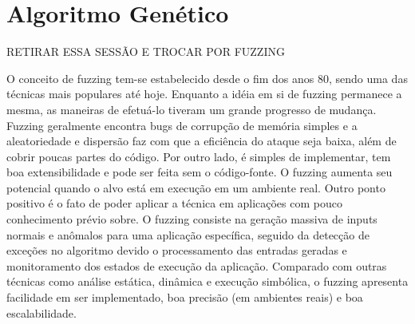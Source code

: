 \section{Algoritmo Genético}

    RETIRAR ESSA SESSÃO E TROCAR POR FUZZING
    
O conceito de fuzzing tem-se estabelecido desde o fim dos anos 80, sendo uma das técnicas mais populares até hoje.
Enquanto a idéia em si de fuzzing permanece a mesma, as maneiras de efetuá-lo tiveram um grande progresso de mudança.
Fuzzing geralmente encontra bugs de corrupção de memória simples e a aleatoriedade e dispersão faz com que a eficiência do ataque seja baixa, além de cobrir poucas partes do código. Por outro lado, é simples de implementar, tem boa extensibilidade e pode ser feita sem o código-fonte. O fuzzing aumenta seu potencial quando o alvo está em execução em um ambiente real. Outro ponto positivo é o fato de poder aplicar a técnica em aplicações com pouco conhecimento prévio sobre.
O fuzzing consiste na geração massiva de inputs normais e anômalos para uma aplicação específica, seguido da detecção de exceções no algoritmo devido o processamento das entradas geradas e monitoramento dos estados de execução da aplicação.
Comparado com outras técnicas como análise estática, dinâmica e execução simbólica, o fuzzing apresenta facilidade em ser implementado, boa precisão (em ambientes reais) e boa escalabilidade.

